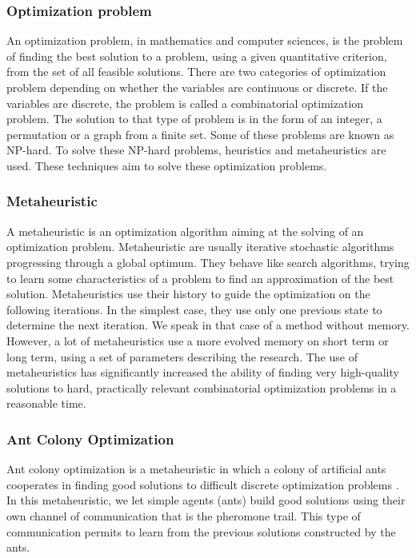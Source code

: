 \subsubsection{Optimization problem}
An optimization problem, in mathematics and computer sciences, is the problem of finding the best solution to a problem, using a given quantitative criterion, from the set of all feasible solutions. There are two categories of optimization problem depending on whether the variables are continuous or discrete. If the variables are discrete, the problem is called a combinatorial optimization problem. The solution to that type of problem is in the form of an integer, a permutation or a graph from a finite set. Some of these problems are known as NP-hard. To solve these NP-hard problems, heuristics and metaheuristics are used. These techniques aim to solve these optimization problems.

\subsubsection{Metaheuristic}
A metaheuristic is an optimization algorithm aiming at the solving of an optimization problem. Metaheuristic are usually iterative stochastic algorithms progressing through a global optimum. They behave like search algorithms, trying to learn some characteristics of a problem to find an approximation of the best solution.
Metaheuristics use their history to guide the optimization on the following iterations. In the simplest case, they use only one previous state to determine the next iteration. We speak in that case of a method without memory. However, a lot of metaheuristics use a more evolved memory on short term or long term, using a set of parameters describing the research.
The use of metaheuristics has significantly increased the ability of finding very high-quality solutions to hard, practically relevant combinatorial optimization problems in a reasonable time. \cite{dorigo2004ant}



\subsubsection{Ant Colony Optimization}
Ant colony optimization is a metaheuristic in which a colony of artificial ants cooperates in finding good solutions to difficult discrete optimization problems \cite{dorigo2004ant}. In this metaheuristic, we let simple agents (ants) build good solutions using their own channel of communication that is the pheromone trail. This type of communication permits to learn from the previous solutions constructed by the ants.

